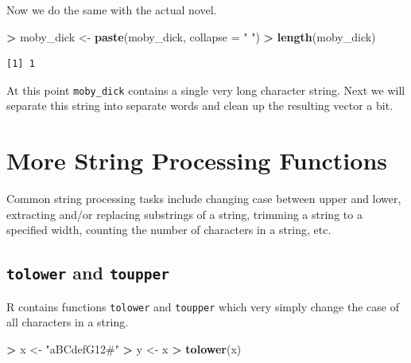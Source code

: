 \documentclass[
]{krantz}
\makeatletter
\newenvironment{Shaded}{\begin{snugshade}}{\end{snugshade}}
\newcommand{\DataTypeTok}[1]{\textcolor[rgb]{0.27,0.27,0.27}{#1}}
\newcommand{\KeywordTok}[1]{\textcolor[rgb]{0.27,0.27,0.27}{\textbf{#1}}}
\newcommand{\NormalTok}[1]{#1}
\newcommand{\OperatorTok}[1]{\textcolor[rgb]{0.43,0.43,0.43}{\textbf{#1}}}
\newcommand{\StringTok}[1]{\textcolor[rgb]{0.5,0.5,0.5}{#1}}
\newenvironment{kframe}{%
\medskip{}
\setlength{\fboxsep}{.8em}
 \def\at@end@of@kframe{}%
 \ifinner\ifhmode%
  \def\at@end@of@kframe{\end{minipage}}%
  \begin{minipage}{\columnwidth}%
 \fi\fi%
 \def\FrameCommand##1{\hskip\@totalleftmargin \hskip-\fboxsep
 \colorbox{shadecolor}{##1}\hskip-\fboxsep
     \hskip-\linewidth \hskip-\@totalleftmargin \hskip\columnwidth}%
 \MakeFramed {\advance\hsize-\width
   \@totalleftmargin\z@ \linewidth\hsize
   \@setminipage}}%
 {\par\unskip\endMakeFramed%
 \at@end@of@kframe}
\renewenvironment{Shaded}{\begin{kframe}}{\end{kframe}}
\makeatother
\begin{document}
Now we do the same with the actual novel.

\begin{Shaded}
\begin{Highlighting}[]
\OperatorTok{\textgreater{}}\StringTok{ }\NormalTok{moby\_dick \textless{}{-}}\StringTok{ }\KeywordTok{paste}\NormalTok{(moby\_dick, }\DataTypeTok{collapse =} \StringTok{" "}\NormalTok{)}
\OperatorTok{\textgreater{}}\StringTok{ }\KeywordTok{length}\NormalTok{(moby\_dick)}
\end{Highlighting}
\end{Shaded}

\begin{verbatim}
[1] 1
\end{verbatim}

At this point \texttt{moby\_dick} contains a single very long character string. Next we will separate this string into separate words and clean up the resulting vector a bit.

\hypertarget{more-string-processing-functions}{%
\section{More String Processing Functions}\label{more-string-processing-functions}}

Common string processing tasks include changing case between upper and lower, extracting and/or replacing substrings of a string, trimming a string to a specified width, counting the number of characters in a string, etc.

\hypertarget{tolower-and-toupper}{%
\subsection{\texorpdfstring{\texttt{tolower} and \texttt{toupper}}{tolower and toupper}}\label{tolower-and-toupper}}

R contains functions \texttt{tolower} and \texttt{toupper} which very simply change the case of all characters in a string.

\begin{Shaded}
\begin{Highlighting}[]
\OperatorTok{\textgreater{}}\StringTok{ }\NormalTok{x \textless{}{-}}\StringTok{ "aBCdefG12\#"}
\OperatorTok{\textgreater{}}\StringTok{ }\NormalTok{y \textless{}{-}}\StringTok{ }\NormalTok{x}
\OperatorTok{\textgreater{}}\StringTok{ }\KeywordTok{tolower}\NormalTok{(x)}
\end{Highlighting}
\end{Shaded}
\end{document}
